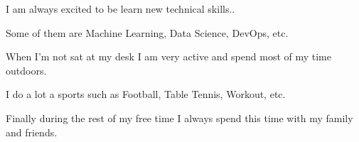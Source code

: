 

\begin{cventries}
  \cventry
    {} %
    {} %
    {} %
    {} %
    {
      \begin{cvitems} %
        \item {I am always excited to be learn new technical skills..}
        \item {Some of them are Machine Learning, Data Science, DevOps, etc.}
        \item {When I’m not sat at my desk I am very active and spend most of my time outdoors.}
        \item {I do a lot a sports such as Football, Table Tennis, Workout, etc.}
        \item {Finally during the rest of my free time I always spend this time with my family and friends.}
      \end{cvitems}
    }
\end{cventries}
